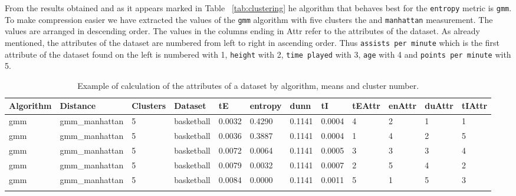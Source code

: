 From the results obtained and as it appears marked in Table ~\ref{tab:clustering} he algorithm that behaves best for the \texttt{entropy} metric is \texttt{gmm}. To make compression easier we have extracted the values of the \texttt{gmm} algorithm with five clusters the and \texttt{manhattan} measurement. The values are arranged in descending order. The values in the columns ending in Attr refer to the attributes of the dataset. As already mentioned, the attributes of the dataset are numbered from left to right in ascending order. Thus \texttt{assists per minute} which is the first attribute of the dataset found on the left is numbered with 1, \texttt{height} with 2, \texttt{time played} with 3, \texttt{age} with 4 and \texttt{points per minute} with 5.
\newline
\newline
{\small
\begin{longtable}{| p{1cm} | p{1.8cm} | p{0.7cm} | p{0.9cm} | p{0.5cm} | p{0.65cm} | p{0.5cm} | p{0.5cm} | p{0.55cm} | p{0.55cm} | p{0.6cm} | p{0.5cm} |}
\hline
\scriptsize  Algorithm & \scriptsize  Distance  &  \scriptsize Clusters & \scriptsize  Dataset & \scriptsize tE & \scriptsize entropy & \scriptsize  dunn  & \scriptsize tI & \scriptsize tEAttr & \scriptsize enAttr & \scriptsize duAttr & \scriptsize tIAttr  \\
\hline
\scriptsize     gmm   & \scriptsize    gmm\_manhattan & \scriptsize    5    & \scriptsize basketball & \scriptsize    0.0032  &  \scriptsize 0.4290 & \scriptsize 0.1141 & \scriptsize    0.0004 & \scriptsize   4  & \scriptsize    2  & \scriptsize    1  & \scriptsize    1 \\
\scriptsize     gmm   & \scriptsize    gmm\_manhattan & \scriptsize    5    & \scriptsize basketball & \scriptsize    0.0036  &  \scriptsize 0.3887 & \scriptsize 0.1141 & \scriptsize    0.0004 & \scriptsize   1  & \scriptsize    4  & \scriptsize    2  & \scriptsize    5 \\
\scriptsize     gmm   & \scriptsize    gmm\_manhattan & \scriptsize    5    & \scriptsize basketball & \scriptsize    0.0072  &  \scriptsize 0.0064 & \scriptsize 0.1141 & \scriptsize    0.0005 & \scriptsize   3  & \scriptsize    3  & \scriptsize    3  & \scriptsize    4 \\
\scriptsize     gmm   & \scriptsize    gmm\_manhattan & \scriptsize    5    & \scriptsize basketball & \scriptsize    0.0079  &  \scriptsize 0.0032 & \scriptsize 0.1141 & \scriptsize    0.0007 & \scriptsize   2  & \scriptsize    5  & \scriptsize    4  & \scriptsize    2 \\
\scriptsize     gmm   & \scriptsize    gmm\_manhattan & \scriptsize    5    & \scriptsize basketball & \scriptsize    0.0084  &  \scriptsize 0.0000 & \scriptsize 0.1141 & \scriptsize    0.0011 & \scriptsize   5  & \scriptsize    1  & \scriptsize    5  & \scriptsize    3 \\
\hline
\caption{Example of calculation of the attributes of a dataset by algorithm, means and cluster number.}
\label{tab:clusteringExample}
\end{longtable}}
